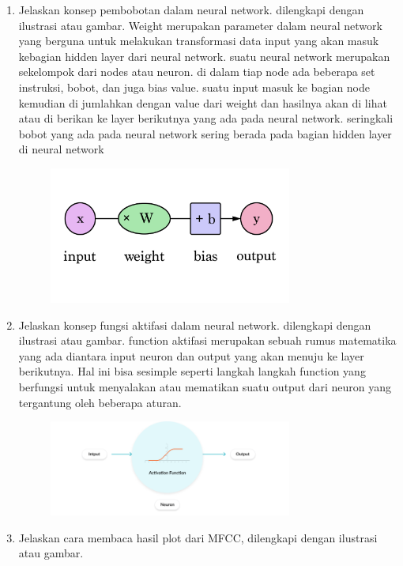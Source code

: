 \begin{enumerate}
\begin{figure}[H]
		\centering
	\end{figure}
	\item Jelaskan konsep pembobotan dalam neural network. dilengkapi dengan ilustrasi atau gambar.
	\hfill\break
	Weight merupakan parameter dalam neural network yang berguna untuk melakukan transformasi data input yang akan masuk kebagian hidden layer dari neural network. suatu neural network merupakan sekelompok dari nodes atau neuron. di dalam tiap node ada beberapa set instruksi, bobot, dan juga bias value. suatu input masuk ke bagian node kemudian di jumlahkan dengan value dari weight dan hasilnya akan di lihat atau di berikan ke layer berikutnya yang ada pada neural network. seringkali bobot yang ada pada neural network sering berada pada bagian hidden layer di neural network
	\begin{figure}[H]
		\includegraphics[width=8cm]{figures/1174079/6/weight.png}
		\centering
	\end{figure}
	\item Jelaskan konsep fungsi aktifasi dalam neural network.  dilengkapi dengan ilustrasi atau gambar.
	\hfill\break
	function aktifasi merupakan sebuah rumus matematika yang ada diantara input neuron dan output yang akan menuju ke layer berikutnya. Hal ini bisa sesimple seperti langkah langkah function yang  berfungsi untuk menyalakan atau mematikan suatu output dari neuron yang tergantung oleh beberapa aturan.
	\begin{figure}[H]
		\includegraphics[width=8cm]{figures/1174079/6/aktifasi.png}
		\centering
	\end{figure}
	\item Jelaskan cara membaca hasil plot dari MFCC, dilengkapi dengan ilustrasi atau gambar.
	\hfill\break
	\begin{figure}[H]

\end{figure}
\end{enumerate}
